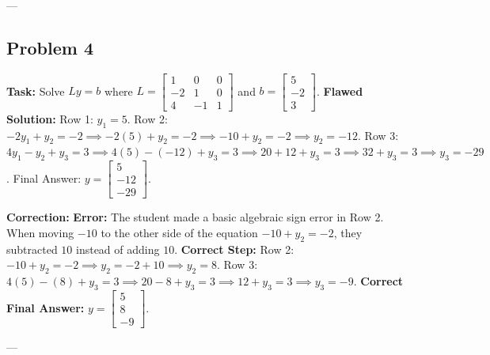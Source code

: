 \documentclass[11pt]{article}
\begin{document}
---

\subsection{Problem 4}
\textbf{Task:} Solve $Ly = b$ where $L = \begin{bmatrix} 1 & 0 & 0 \\ -2 & 1 & 0 \\ 4 & -1 & 1 \end{bmatrix}$ and $b = \begin{bmatrix} 5 \\ -2 \\ 3 \end{bmatrix}$.
\textbf{Flawed Solution:}
Row 1: $y_1 = 5$.
Row 2: $-2y_1 + y_2 = -2 \implies -2(5) + y_2 = -2 \implies -10 + y_2 = -2 \implies y_2 = -12$.
Row 3: $4y_1 - y_2 + y_3 = 3 \implies 4(5) - (-12) + y_3 = 3 \implies 20 + 12 + y_3 = 3 \implies 32 + y_3 = 3 \implies y_3 = -29$.
Final Answer: $y = \begin{bmatrix} 5 \\ -12 \\ -29 \end{bmatrix}$.

\vspace{1cm}
\textbf{Correction:}
\textbf{Error:} The student made a basic algebraic sign error in Row 2. When moving $-10$ to the other side of the equation $-10 + y_2 = -2$, they subtracted $10$ instead of adding $10$.
\textbf{Correct Step:}
Row 2: $-10 + y_2 = -2 \implies y_2 = -2 + 10 \implies y_2 = 8$.
Row 3: $4(5) - (8) + y_3 = 3 \implies 20 - 8 + y_3 = 3 \implies 12 + y_3 = 3 \implies y_3 = -9$.
\textbf{Correct Final Answer:} $y = \begin{bmatrix} 5 \\ 8 \\ -9 \end{bmatrix}$.

---
\end{document}
